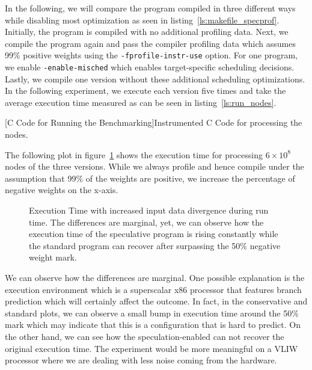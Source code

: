 In the following, we will compare the program compiled in three different ways while disabling most optimization as seen in listing~\ref{ls:makefile_specprof}. Initially, the program is compiled with no additional profiling data. Next, we compile the program again and pass the compiler profiling data which assumes 99\% positive weights using the \texttt{-fprofile-instr-use} option. For one program, we enable \texttt{-enable-misched} which enables target-specific scheduling decisions. Lastly, we compile one version without these additional scheduling optimizations. In the following experiment, we execute each version five times and take the average execution time measured as can be seen in listing~\ref{ls:run_nodes}.
\begin{center}
        
        \captionsetup{type=listing}
        [C Code for Running the Benchmarking]{Instrumented C Code for processing the nodes.}
        \label{ls:run_nodes}
\end{center}
The following plot in figure~\ref{fig:plot_specdiv} shows the execution time for processing $6\times10^8$ nodes of the three versions. While we always profile and hence compile under the assumption that 99\% of the weights are positive, we increase the percentage of negative weights on the x-axis.  
\begin{center}
    \begin{minipage}{.87\textwidth}
        \begin{figure}[H]
            \centering
            
            \caption[Execution Time with increased Input Data Divergence]{Execution Time with increased input data divergence during run time. The differences are marginal, yet, we can observe how the execution time of the speculative program is rising constantly while the standard program can recover after surpassing the 50\% negative weight mark.}
            \label{fig:plot_specdiv}
\end{figure}
    \end{minipage}
\end{center} 
We can observe how the differences are marginal. One possible explanation is the execution environment which is a superscalar x86 processor that features branch prediction which will certainly affect the outcome. In fact, in the conservative and standard plots, we can observe a small bump in execution time around the 50\% mark which may indicate that this is a configuration that is hard to predict. On the other hand, we can see how the speculation-enabled can not recover the original execution time. The experiment would be more meaningful on a VLIW processor where we are dealing with less noise coming from the hardware. 


